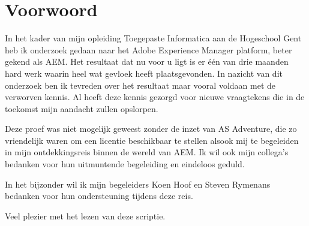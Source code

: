 \documentclass{article}
\begin{document}
	\section{Voorwoord}
	In het kader van mijn opleiding Toegepaste Informatica aan de Hogeschool Gent
	heb ik onderzoek gedaan naar het Adobe Experience Manager platform, beter gekend als AEM. 
	Het resultaat dat nu voor u ligt is er \'e\'en van drie maanden hard werk waarin heel wat gevloek heeft plaatsgevonden. 
	In nazicht van dit onderzoek ben ik tevreden over het resultaat maar vooral voldaan met de verworven kennis. 
	Al heeft deze kennis gezorgd voor nieuwe vraagtekens die in de toekomst mijn aandacht zullen opslorpen.
	\par
	\par
	Deze proef was niet mogelijk geweest zonder de inzet van AS Adventure, die zo vriendelijk waren om een licentie
	beschikbaar te stellen alsook mij te begeleiden in mijn ontdekkingsreis binnen de wereld van AEM. 
	Ik wil ook mijn collega’s bedanken voor hun uitmuntende begeleiding en eindeloos geduld.
	\par
	In het bijzonder wil ik mijn begeleiders Koen Hoof en Steven Rymenans bedanken voor hun ondersteuning tijdens deze reis.
	\par
	Veel plezier met het lezen van deze scriptie.
\end{document}
